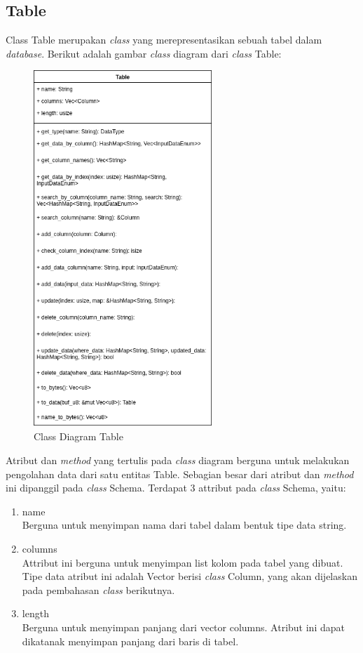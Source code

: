 \subsection{Table}
Class Table merupakan \emph{class} yang merepresentasikan sebuah tabel dalam \emph{database}. Berikut adalah gambar \emph{class} diagram dari \emph{class} Table:
\begin{figure}[H]
  \centering{}
	\includegraphics[width=0.6\textwidth]{gambar/bab4/Table}
  \caption{Class Diagram Table}
\end{figure}

Atribut dan \emph{method} yang tertulis pada \emph{class} diagram berguna untuk melakukan pengolahan data dari satu entitas Table. Sebagian besar dari atribut dan \emph{method} ini
dipanggil pada \emph{class} Schema. Terdapat 3 attribut pada \emph{class} Schema, yaitu:

\begin{enumerate}
	\item name \\
	Berguna untuk menyimpan nama dari tabel dalam bentuk tipe data string.

	\item columns \\
	Attribut ini berguna untuk menyimpan list kolom pada tabel yang dibuat. Tipe data atribut ini adalah Vector berisi \emph{class} Column, yang akan 
  dijelaskan pada pembahasan \emph{class} berikutnya. 

	\item length \\
	Berguna untuk menyimpan panjang dari vector columns. Atribut ini dapat dikatanak menyimpan panjang dari baris di tabel.
\end{enumerate}

